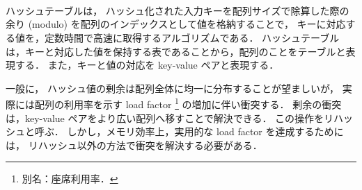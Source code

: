 \thispagestyle{empty} %

　\\
\\
\\
\\
\\
\\
\\
\\

ハッシュテーブルは，
ハッシュ化された入力キーを配列サイズで除算した際の余り (modulo) を配列のインデックスとして値を格納することで，
キーに対応する値を，定数時間で高速に取得するアルゴリズムである．
ハッシュテーブルは，キーと対応した値を保持する表であることから，配列のことをテーブルと表現する．
また，キーと値の対応を key-value ペアと表現する．

一般に，
ハッシュ値の剰余は配列全体に均一に分布することが望ましいが，
実際には配列の利用率を示す load factor \footnote{別名：座席利用率．} の増加に伴い衝突する．
剰余の衝突は，key-value ペアをより広い配列へ移すことで解決できる．
この操作をリハッシュと呼ぶ．
しかし，メモリ効率上，実用的な load factor を達成するためには，
リハッシュ以外の方法で衝突を解決する必要がある．

